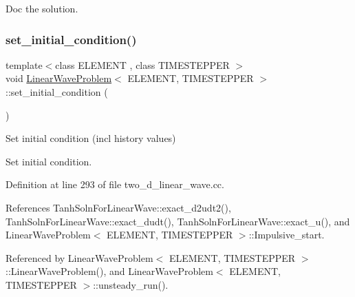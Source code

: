Doc the solution. 

\mbox{\label{classLinearWaveProblem_afb5d327791d8289a8a0a565afc8aee37}} 
\subsubsection{\texorpdfstring{set\+\_\+initial\+\_\+condition()}{set\_initial\_condition()}\hspace{0.1cm}{\footnotesize\ttfamily [1/2]}}
{\footnotesize\ttfamily template$<$class E\+L\+E\+M\+E\+NT , class T\+I\+M\+E\+S\+T\+E\+P\+P\+ER $>$ \\
void \hyperlink{classLinearWaveProblem}{Linear\+Wave\+Problem}$<$ E\+L\+E\+M\+E\+NT, T\+I\+M\+E\+S\+T\+E\+P\+P\+ER $>$\+::set\+\_\+initial\+\_\+condition (\begin{DoxyParamCaption}{ }\end{DoxyParamCaption})}



Set initial condition (incl history values) 

Set initial condition. 

Definition at line 293 of file two\+\_\+d\+\_\+linear\+\_\+wave.\+cc.



References Tanh\+Soln\+For\+Linear\+Wave\+::exact\+\_\+d2udt2(), Tanh\+Soln\+For\+Linear\+Wave\+::exact\+\_\+dudt(), Tanh\+Soln\+For\+Linear\+Wave\+::exact\+\_\+u(), and Linear\+Wave\+Problem$<$ E\+L\+E\+M\+E\+N\+T, T\+I\+M\+E\+S\+T\+E\+P\+P\+E\+R $>$\+::\+Impulsive\+\_\+start.



Referenced by Linear\+Wave\+Problem$<$ E\+L\+E\+M\+E\+N\+T, T\+I\+M\+E\+S\+T\+E\+P\+P\+E\+R $>$\+::\+Linear\+Wave\+Problem(), and Linear\+Wave\+Problem$<$ E\+L\+E\+M\+E\+N\+T, T\+I\+M\+E\+S\+T\+E\+P\+P\+E\+R $>$\+::unsteady\+\_\+run().

\mbox{\label{classLinearWaveProblem_afb5d327791d8289a8a0a565afc8aee37}} 

